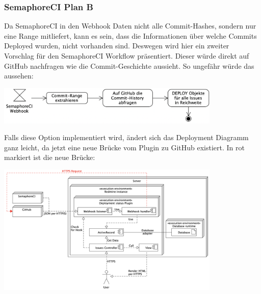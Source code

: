 \subsubsection{SemaphoreCI Plan B}
Da SemaphoreCI in den Webhook Daten nicht alle Commit-Hashes, sondern nur eine Range mitliefert, kann es sein, dass die
Informationen über welche Commits Deployed wurden, nicht vorhanden sind. Deswegen wird hier ein zweiter Vorschlag für den
SemaphoreCI Workflow präsentiert. Dieser würde direkt auf GitHub nachfragen wie die Commit-Geschichte aussieht. So
ungefähr würde das aussehen: \newline
\begin{center}
  \includegraphics[width=0.8\textwidth]{images/activity/semaphore-backup-hooks.png}
  \label{fig:activity_plan_b}
  \newline
\end{center}
Falls diese Option implementiert wird, ändert sich das Deployment Diagramm ganz leicht, da jetzt
eine neue Brücke vom Plugin zu GitHub existiert. In rot markiert ist die neue Brücke: \newline
\begin{center}
  \includegraphics[width=0.8\textwidth]{images/deployment/backup-hooks.png}
  \label{fig:activity_plan_b_deployment}
\end{center}

